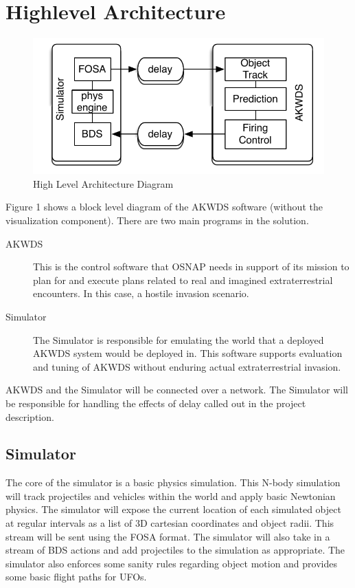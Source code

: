\section{Highlevel Architecture}
\label{architecture}

\begin{figure}[h]
\includegraphics{./akwds_arch.pdf}
\caption{High Level Architecture Diagram}
\label{fig:arch}
\end{figure}

Figure 1 shows a block level diagram of the AKWDS software (without the visualization component). There are two main programs in the solution.
\begin{description}
\item[AKWDS] This is the control software that OSNAP needs in support of its mission to plan for and execute plans related to real and imagined extraterrestrial encounters. In this case, a hostile invasion scenario.
\item[Simulator] The Simulator is responsible for emulating the world that a deployed AKWDS system would be deployed in. This software supports evaluation and tuning of AKWDS without enduring actual extraterrestrial invasion.
\end{description}
AKWDS and the Simulator will be connected over a network. The Simulator will be responsible for handling the effects of delay called out in the project description.

\subsection*{Simulator}
The core of the simulator is a basic physics simulation. This N-body simulation will track projectiles and vehicles within the world and apply basic Newtonian physics. The simulator will expose the current location of each simulated object at regular intervals as a list of 3D cartesian coordinates and object radii. This stream will be sent using the FOSA format. The simulator will also take in a stream of BDS actions and add projectiles to the simulation as appropriate. The simulator also enforces some sanity rules regarding object motion and provides some basic flight paths for UFOs.

